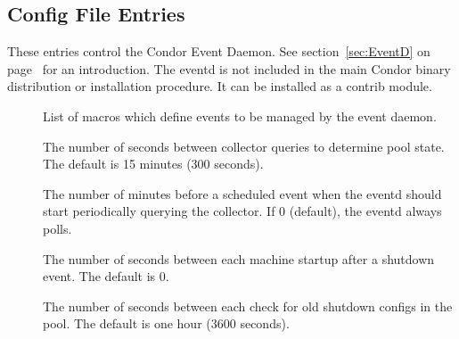 \subsection{\label{sec:Eventd-Config-File-Entries}
 Config File Entries}

These entries control the Condor Event Daemon.  See
section~\ref{sec:EventD} on page~\pageref{sec:EventD} for an
introduction.  The eventd is not included in the main Condor binary
distribution or installation procedure.  It can be installed as a
contrib module.

\begin{description}
  
\item[] \label{param:EventList} List of macros
which define events to be managed by the event daemon.

\item[] \label{param:EventdInterval} The number
of seconds between collector queries to determine pool
state.  The default is 15 minutes (300 seconds).

\item[]
\label{param:EventdMaxPreparation}  The number of minutes before a
scheduled event when the eventd should start periodically querying the
collector.  If 0 (default), the eventd always polls.

\item[]
\label{param:EventdShutdownSlowStartInterval} The number of seconds
between each machine startup after a shutdown event.  The default is
0.

\item[]
\label{param:EventdShutdownCleanupInterval} The number of seconds
between each check for old shutdown configs in the pool.  The default
is one hour (3600 seconds).

\end{description}
